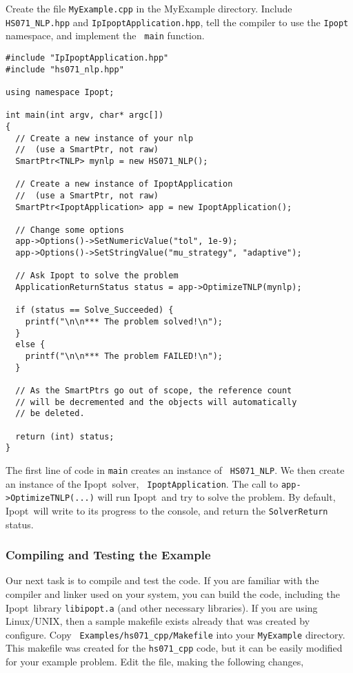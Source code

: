 \documentclass[letter,10pt]{article}
\newcommand{\Ipopt}{{\sc Ipopt}}
\begin{document}
Create the file {\tt MyExample.cpp} in the MyExample directory.
Include {\tt HS071\_NLP.hpp} and {\tt IpIpoptApplication.hpp}, tell
the compiler to use the {\tt Ipopt} namespace, and implement the {\tt
  main} function.
\begin{footnotesize}
\begin{verbatim}
#include "IpIpoptApplication.hpp"
#include "hs071_nlp.hpp"

using namespace Ipopt;

int main(int argv, char* argc[])
{
  // Create a new instance of your nlp 
  //  (use a SmartPtr, not raw)
  SmartPtr<TNLP> mynlp = new HS071_NLP();

  // Create a new instance of IpoptApplication
  //  (use a SmartPtr, not raw)
  SmartPtr<IpoptApplication> app = new IpoptApplication();

  // Change some options
  app->Options()->SetNumericValue("tol", 1e-9);
  app->Options()->SetStringValue("mu_strategy", "adaptive");

  // Ask Ipopt to solve the problem
  ApplicationReturnStatus status = app->OptimizeTNLP(mynlp);

  if (status == Solve_Succeeded) {
    printf("\n\n*** The problem solved!\n");
  }
  else {
    printf("\n\n*** The problem FAILED!\n");
  }

  // As the SmartPtrs go out of scope, the reference count
  // will be decremented and the objects will automatically 
  // be deleted.

  return (int) status;
}
\end{verbatim} 
\end{footnotesize}

The first line of code in {\tt main} creates an instance of {\tt
  HS071\_NLP}. We then create an instance of the \Ipopt\ solver, {\tt
  IpoptApplication}. The call to {\tt app->OptimizeTNLP(...)} will run
\Ipopt\ and try to solve the problem. By default, \Ipopt\ will write
to its progress to the console, and return the {\tt SolverReturn}
status.

\subsubsection{Compiling and Testing the Example}
Our next task is to compile and test the code. If you are familiar
with the compiler and linker used on your system, you can build the
code, including the \Ipopt\ library {\tt libipopt.a} (and other
necessary libraries).  If you are using Linux/UNIX, then a sample
makefile exists already that was created by configure. Copy {\tt
  Examples/hs071\_cpp/Makefile} into your {\tt MyExample} directory.
This makefile was created for the {\tt hs071\_cpp} code, but it can be
easily modified for your example problem. Edit the file, making the
following changes,
\end{document}
